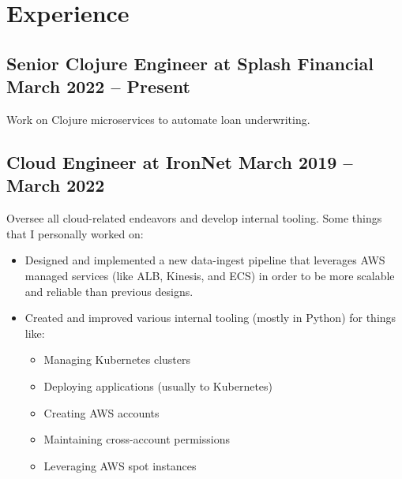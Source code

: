 \documentclass[12pt]{article}
\begin{document}

\section*{Experience}

\subsection*{Senior Clojure Engineer at Splash Financial \hfill March 2022 -- Present}

Work on Clojure microservices to automate loan underwriting.

     

\subsection*{Cloud Engineer at IronNet \hfill March 2019 -- March 2022}

Oversee all cloud-related endeavors and develop internal tooling. Some things
that I personally worked on:

\begin{itemize}
\item Designed and implemented a new data-ingest pipeline that leverages AWS
  managed services (like ALB, Kinesis, and ECS) in order to be more scalable and
  reliable than previous designs.
\item Created and improved various internal tooling (mostly in Python) for
  things like:

  \begin{multicols}{2}
    \raggedright
    \begin{itemize}
    \item Managing Kubernetes clusters
    \item Deploying applications (usually to Kubernetes)
    \item Creating AWS accounts
    \item Maintaining cross-account permissions
    \item Leveraging AWS spot instances
    \end{itemize}
  \end{multicols}

\end{itemize}

     
 
\end{document}
